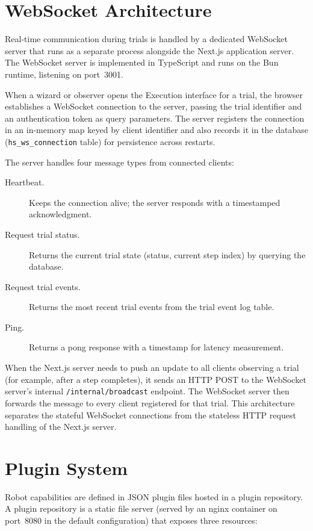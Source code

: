 \section{WebSocket Architecture}
\label{sec:ws-arch}

Real-time communication during trials is handled by a dedicated WebSocket server that runs as a separate process alongside the Next.js application server. The WebSocket server is implemented in TypeScript and runs on the Bun runtime, listening on port~3001.

When a wizard or observer opens the Execution interface for a trial, the browser establishes a WebSocket connection to the server, passing the trial identifier and an authentication token as query parameters. The server registers the connection in an in-memory map keyed by client identifier and also records it in the database (\texttt{hs\_ws\_connection} table) for persistence across restarts.

The server handles four message types from connected clients:

\begin{description}
\item[Heartbeat.] Keeps the connection alive; the server responds with a timestamped acknowledgment.
\item[Request trial status.] Returns the current trial state (status, current step index) by querying the database.
\item[Request trial events.] Returns the most recent trial events from the trial event log table.
\item[Ping.] Returns a pong response with a timestamp for latency measurement.
\end{description}

When the Next.js server needs to push an update to all clients observing a trial (for example, after a step completes), it sends an HTTP POST to the WebSocket server's internal \texttt{/internal/broadcast} endpoint. The WebSocket server then forwards the message to every client registered for that trial. This architecture separates the stateful WebSocket connections from the stateless HTTP request handling of the Next.js server.

\section{Plugin System}

Robot capabilities are defined in JSON plugin files hosted in a plugin repository. A plugin repository is a static file server (served by an nginx container on port~8080 in the default configuration) that exposes three resources:

